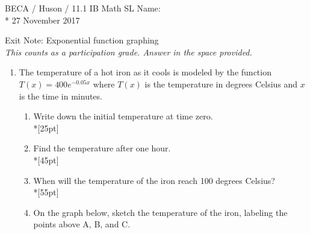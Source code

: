 \documentclass[]{book}
\begin{document}
\noindent BECA / Huson / 11.1 IB Math SL \hspace{2in} Name:\\*
27 November 2017
\begin{center}
{\Large Exit Note: Exponential function graphing}\\
\textit{This counts as a participation grade. Answer in the space provided.}
\end{center}



\begin{enumerate}
\item The temperature of a hot iron as it cools is modeled by the function $T(x)=400e^{-0.05x}$ where $T(x)$ is the temperature in degrees Celsius and $x$ is the time in minutes. 

\begin{enumerate}
    \item Write down the initial temperature at time zero.\\*[25pt]
    \item Find the temperature after one hour.\\*[45pt]
    \item When will the temperature of the iron reach 100 degrees Celsius?\\*[55pt]
    \item On the graph below, sketch the temperature of the iron, labeling the points above A, B, and C.
\end{enumerate}

\begin{figure}[!htbp]
\begin{center}
\end{center}
\end{figure}
\end{enumerate}
\end{document}
